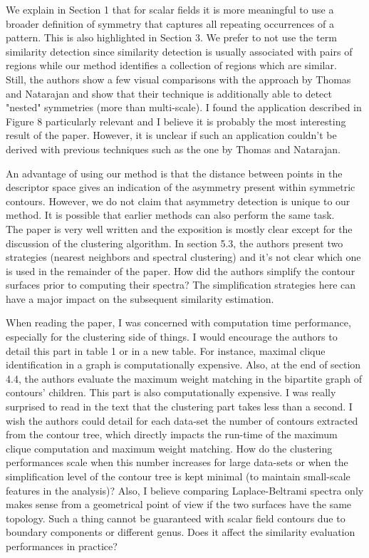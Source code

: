 \documentclass[10pt]{article}
\begin{document}
	
   {\color{blue}We explain in Section 1 that for scalar fields it is more
	   meaningful to use a broader definition of symmetry that captures
	   all repeating occurrences of a pattern. This is also highlighted in
	   Section 3. We prefer to not use the term similarity detection
	   since similarity detection is usually associated with pairs of regions
   	   while our method identifies a collection of regions which are similar.}\\

   Still, the authors show a few visual comparisons with the approach by
   Thomas and Natarajan and show that their technique is additionally able
   to detect "nested" symmetries (more than multi-scale).
   I found the application described in Figure 8 particularly relevant and I
   believe it is probably the most interesting result of the paper. However,
   it is unclear if such an application couldn't be derived with previous
   techniques such as the one by Thomas and Natarajan.

   {\color{blue}An advantage of using our method is that the distance between
	   points in the descriptor space gives an indication of the asymmetry
	   present within symmetric contours. However, we do not claim that
	   asymmetry detection is unique to our method. It is possible that
   earlier methods can also perform the same task.}\\

The paper is very well written and the exposition is mostly clear except
   for the discussion of the clustering algorithm. In section 5.3, the
   authors present two strategies (nearest neighbors and spectral
   clustering) and it's not clear which one is used in the remainder of the
   paper.
   How did the authors simplify the contour surfaces prior to computing
   their spectra? The simplification strategies here can have a major impact
   on the subsequent similarity estimation.

   When reading the paper, I was concerned with computation time
   performance, especially for the clustering side of things. I would
   encourage the authors to detail this part in table 1 or in a new table.
   For instance, maximal clique identification in a graph is computationally
   expensive. Also, at the end of section 4.4, the authors evaluate the
   maximum weight matching in the bipartite graph of contours' children.
   This part is also computationally expensive. I was really surprised to
   read in the text that the clustering part takes less than a 
   second. I wish the authors could detail for each data-set the number of 
   contours extracted from the contour tree, which directly impacts the
   run-time of the maximum clique computation and maximum weight matching.
   How do the clustering performances scale when this number increases for
   large data-sets or when the simplification level of the contour tree is
   kept minimal (to maintain small-scale features in the analysis)?
   Also, I believe comparing Laplace-Beltrami spectra only makes sense from
   a geometrical point of view if the two surfaces have the same topology.
   Such a thing cannot be guaranteed with scalar field contours due to
   boundary components or different genus. Does it affect the similarity
   evaluation performances in practice?
\end{document}
